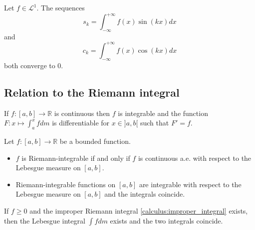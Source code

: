         \begin{theorem}\label{lebesgue:riemann_lebesue_lemma}
			Let $f\in\mathcal{L}^1$. The sequences \[s_k = \int_{-\infty}^{+\infty}f(x)\sin(kx)dx\] and \[c_k = \int_{-\infty}^{+\infty}f(x)\cos(kx)dx\] both converge to 0.
		\end{theorem}

\subsection{Relation to the Riemann integral}
	\begin{theorem}
		If $f:[a,b]\rightarrow\mathbb{R}$ is continuous then $f$ is integrable and the function $F:x\mapsto\int_a^xfdm$ is differentiable for $x\in]a,b[$ such that $F'=f$.
	\end{theorem}
    
    \begin{theorem}
		Let $f:[a,b]\rightarrow\mathbb{R}$ be a bounded function.
        \begin{itemize}
        	\item $f$ is Riemann-integrable if and only if $f$ is continuous a.e. with respect to the Lebesgue measure on $[a,b]$.
            \item Riemann-integrable functions on $[a,b]$ are integrable with respect to the Lebesgue measure on $[a,b]$ and the integrals coincide.
		\end{itemize}
	\end{theorem}
    
    \begin{theorem}
		If $f\geq0$ and the improper Riemann integral \ref{calculus:improper_integral} exists, then the Lebesgue integral $\int fdm$ exists and the two integrals coincide.
	\end{theorem}